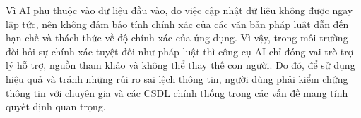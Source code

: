 Vì AI phụ thuộc vào dữ liệu đầu vào,
do việc cập nhật dữ liệu
không được ngay lập tức,
nên không đảm bảo tính chính xác
của các văn bản pháp luật
dẫn đến hạn chế
và thách thức về độ chính xác của ứng dụng.
Vì vậy, trong môi trường đòi hỏi
sự chính xác tuyệt đối như pháp luật
thì công cụ AI
chỉ đóng vai trò trợ lý hỗ trợ, nguồn tham khảo
và không thể thay thế con người.
Do đó, để sử dụng hiệu quả
và tránh những rủi ro sai lệch thông tin,
người dùng phải kiểm chứng thông tin
với chuyên gia và các CSDL chính thống
trong các vấn đề mang tính quyết định quan trọng.
